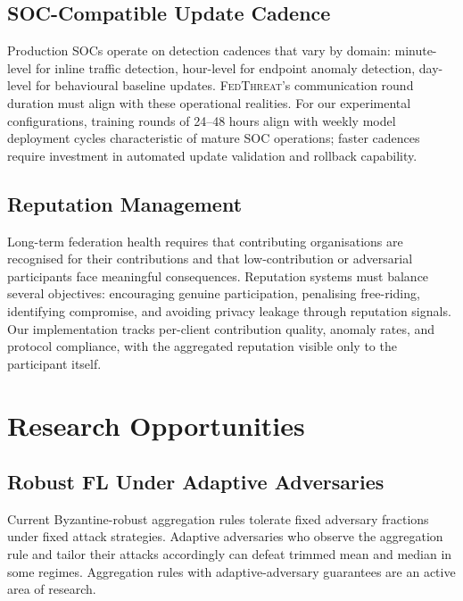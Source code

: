 \documentclass[sigconf,nonacm]{acmart}
\begin{document}
\subsection{SOC-Compatible Update Cadence}

Production SOCs operate on detection cadences that vary by domain: minute-level
for inline traffic detection, hour-level for endpoint anomaly detection,
day-level for behavioural baseline updates. \textsc{FedThreat}'s
communication round duration must align with these operational realities.
For our experimental configurations, training rounds of 24--48 hours
align with weekly model deployment cycles characteristic of mature
SOC operations; faster cadences require investment in automated update
validation and rollback capability.

\subsection{Reputation Management}

Long-term federation health requires that contributing organisations are
recognised for their contributions and that low-contribution or
adversarial participants face meaningful consequences. Reputation systems
must balance several objectives: encouraging genuine participation,
penalising free-riding, identifying compromise, and avoiding privacy
leakage through reputation signals. Our implementation tracks per-client
contribution quality, anomaly rates, and protocol compliance, with the
aggregated reputation visible only to the participant itself.

\section{Research Opportunities}

\subsection{Robust FL Under Adaptive Adversaries}

Current Byzantine-robust aggregation rules tolerate fixed adversary
fractions under fixed attack strategies. Adaptive adversaries who observe
the aggregation rule and tailor their attacks accordingly can defeat
trimmed mean and median in some regimes. Aggregation rules with
adaptive-adversary guarantees are an active area of research.
\end{document}
